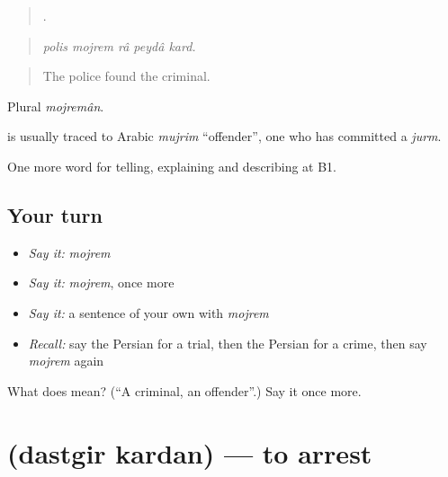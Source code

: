 \begin{quote}
    .
\end{quote}

\begin{quote}
\emph{polis mojrem râ peydâ kard.}
\end{quote}

\begin{quote}
The police found the criminal.
\end{quote}

Plural \emph{mojremân}.

\begin{cousinweb}
\textbf{} is usually traced to Arabic \emph{mujrim} \textquotedblleft{}offender\textquotedblright{}, one who has committed a \emph{jurm}.
\end{cousinweb}

\begin{grammarlens}[title={What you've built}]
One more word for telling, explaining and describing at B1.
\end{grammarlens}

\subsection*{Your turn}
\begin{itemize}
\raggedright
  \item \emph{Say it:} \emph{mojrem}
  \item \emph{Say it:} \emph{mojrem}, once more
  \item \emph{Say it:} a sentence of your own with \emph{mojrem}
  \item \emph{Recall:} say the Persian for a trial, then the Persian for a crime, then say \emph{mojrem} again
\end{itemize}

\begin{tcolorbox}[breakable,colback=teal!4,colframe=teal!35!black,title={Before you move on}]
What does  mean? (\textquotedblleft{}A criminal, an offender\textquotedblright{}.) Say it once more.
\end{tcolorbox}
\section[\texorpdfstring{\fa{دستگیر} \fa{کردن} (dastgir kardan)}{دستگیر کردن (dastgir kardan)}]{  (dastgir kardan) — to arrest}

\label{lesson:FA-C407-dastgir-kardan}



